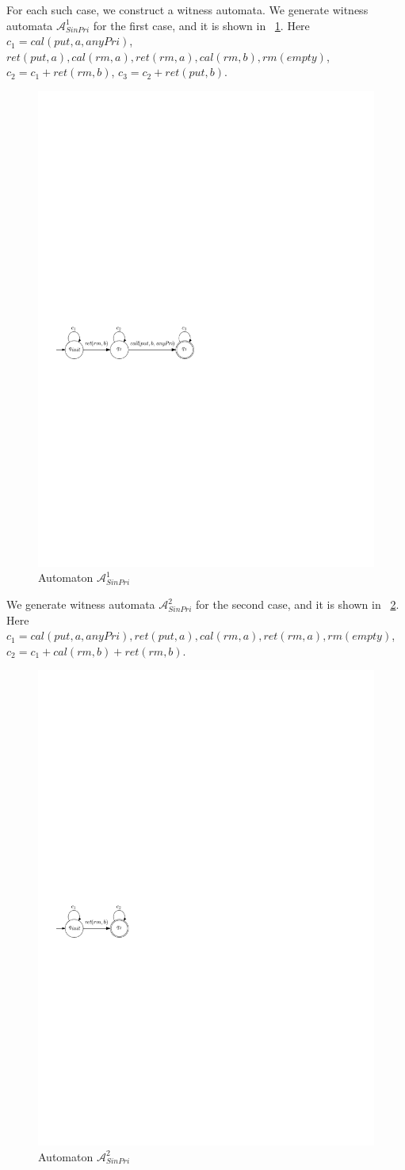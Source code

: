 For each such case, we construct a witness automata. We generate witness automata $\mathcal{A}_{\textit{SinPri}}^1$ for the first case, and it is shown in \figurename~\ref{fig:automata for FIFO-1 in appendix}. Here $c_1 = \textit{cal}(\textit{put},a,\textit{anyPri})$, $\textit{ret}(\textit{put},a), \textit{cal}(\textit{rm},a),\textit{ret}(\textit{rm},a),\textit{cal}(\textit{rm},b),\textit{rm}(\textit{empty})$, $c_2 = c_1 + \textit{ret}(\textit{rm},b)$, $c_3 = c_2 + \textit{ret}(\textit{put},b)$.


\begin{figure}[htbp]
  \centering
  \includegraphics[width=0.6 \textwidth]{figures/PIC_AUTO_FIFO_1.pdf}
  \caption{Automaton $\mathcal{A}_{\textit{SinPri}}^1$}
  \label{fig:automata for FIFO-1 in appendix}
\end{figure}


We generate witness automata $\mathcal{A}_{\textit{SinPri}}^2$ for the second case, and it is shown in \figurename~\ref{fig:automata for FIFO-2}. Here $c_1 = \textit{cal}(\textit{put},a,\textit{anyPri}),\textit{ret}(\textit{put},a), \textit{cal}(\textit{rm},a),\textit{ret}(\textit{rm},a),\textit{rm}(\textit{empty})$, $c_2 = c_1 + \textit{cal}(\textit{rm},b) + \textit{ret}(\textit{rm},b)$.


\begin{figure}[htbp]
  \centering
  \includegraphics[width=0.3 \textwidth]{figures/PIC_AUTO_FIFO_2.pdf}
  \caption{Automaton $\mathcal{A}_{\textit{SinPri}}^2$}
  \label{fig:automata for FIFO-2}
\end{figure}


